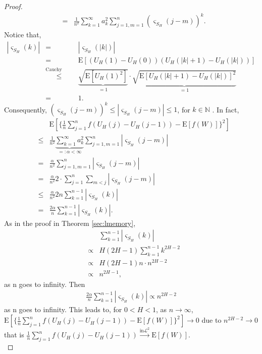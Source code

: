 \documentclass[a4paper, twoside, 11pt]{article}
\theoremstyle{definition}
\begin{document}
\begin{proof}
\begin{eqnarray*}
	  &=& \frac{1}{n^2} \sum\limits_{k=1}^\infty a_k^2\sum\limits_{j=1, m=1}^n (\varsigma_{S_H}(j-m))^k.
	\end{eqnarray*}
	  Notice that,
	  \begin{eqnarray*}
		|\varsigma_{S_H}(k)| &=& |\varsigma_{S_H}(|k|)|\\
		&=& \mathrm{E}[(U_H(1) - U_H(0))(U_H(|k|+1)-U_H(|k|))]\\
		&\overset{\text{Cauchy Schwartz}}{\le}& \underbrace{\sqrt{\mathrm{E}[U_H(1)^2]}}_{= 1}\cdot \underbrace{\sqrt{\mathrm{E}[U_H(|k|+1) - U_H(|k|)]^2}}_{= 1}\\
		&=& 1.
	  \end{eqnarray*}
	  Consequently, $(\varsigma_{S_H}(j-m))^k \le |\varsigma_{S_H}(j-m)| \le 1$, for $k\in \mathbb{N}$ . In fact,
	  \begin{eqnarray*}
		&& \mathrm{E}[\{\frac{1}{n}\sum\limits_{j=1}^n f(U_H(j) - U_H(j-1)) - \mathrm{E}[f(W)]\}^2]\\
		&\le& \frac{1}{n^2} \underbrace{\sum\limits_{k=1}^\infty a_k^2}_{=:\alpha < \infty}\sum\limits_{j=1, m=1}^n |\varsigma_{S_H}(j-m)|\\
		&=& \frac{\alpha}{n^2} \sum\limits_{j=1, m=1}^n |\varsigma_{S_H}(j-m)|\\
		&=& \frac{\alpha}{n^2} 2 \cdot \sum\limits_{j=1}^n  \sum\limits_{m<j} |\varsigma_{S_H}(j-m)|\\
		&\le& \frac{\alpha}{n^2} 2n \sum\limits_{k=1}^{n-1} |\varsigma_{S_H}(k)|\\
		&=& \frac{2\alpha}{n}  \sum\limits_{k=1}^{n-1} |\varsigma_{S_H}(k)|.
	  \end{eqnarray*}
	  As in the proof in Theorem \ref{sec:lmemory}, 
	  \begin{eqnarray*}
	  &&\sum\limits_{k=1}^{n-1} |\varsigma_{S_H}(k)| \\
	  &\propto& H(2H-1)\sum\limits_{k=1}^{n-1}k^{2H-2} \\
	  &\propto& H(2H-1)n\cdot n^{2H-2} \\
	  &\propto& n^{2H-1}, 
	\end{eqnarray*}
	as n goes to infinity. Then
	  \begin{eqnarray*}
		\frac{2\alpha}{n} \sum\limits_{k=1}^{n-1} |\varsigma_{S_H}(k)| \propto n^{2H-2}
	  \end{eqnarray*}
	  as n goes to infinity. This leads to,  for $0<H<1$, as $n \rightarrow \infty$,  $\mathrm{E}[\{\frac{1}{n}\sum\limits_{j=1}^n f(U_H(j) - U_H(j-1)) - \mathrm{E}[f(W)]\}^2]\rightarrow 0$ due to $n^{2H-2}\rightarrow 0$ that is $\frac{1}{n}\sum\limits_{j=1}^n f(U_H(j) - U_H(j-1)) \overset{\text{in} \mathcal{L}^2}{\rightarrow} \mathrm{E}[f(W)]$.\\


\end{proof}
\end{document}
